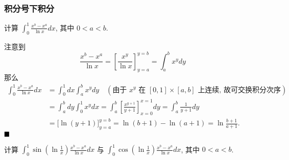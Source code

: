 \documentclass[lang=cn,newtx,10pt,scheme=chinese]{elegantbook}
\begin{document}
\subsubsection{积分号下积分}

\begin{example}
计算 $\int_0^1 \frac{x^b - x^a}{\ln x} dx$, 其中 $0 < a < b$.
\end{example}

\begin{solution}
注意到 $$\frac{x^b - x^a}{\ln x} = \left[ \frac{x^y}{\ln x} \right]_{y=a}^{y=b} = \int_a^b x^y dy$$
那么
\begin{align*}
\int_0^1 \frac{x^b - x^a}{\ln x} dx &= \int_0^1 dx \int_a^b x^y dy \quad (\text{由于 } x^y \text{ 在 } [0,1] \times [a,b] \text{ 上连续, 故可交换积分次序}) \\
&= \int_a^b dy \int_0^1 x^y dx = \int_a^b \left[ \frac{x^{y+1}}{y+1} \right]_{x=0}^{x=1} dy = \int_a^b \frac{1}{y+1} dy \\
&= \big[ \ln(y+1) \big]_{y=a}^{y=b} = \ln(b+1) - \ln(a+1) = \ln\frac{b+1}{a+1}. 
\end{align*}
$ \hfill \blacksquare$
\end{solution}

\begin{example}
计算 $\int_0^1 \sin\left(\ln\frac{1}{x}\right)\frac{x^b - x^a}{\ln x}dx$ 与 $\int_0^1 \cos\left(\ln\frac{1}{x}\right)\frac{x^b - x^a}{\ln x}dx$, 其中 $0 < a < b$.
\end{example}
\end{document}
